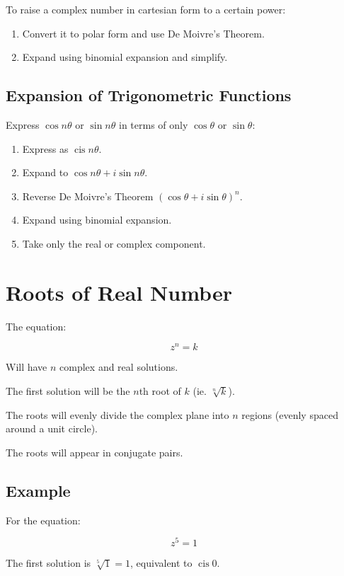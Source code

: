 \documentclass[a4paper,11pt]{article}
\DeclareMathOperator\cis{cis}
\begin{document}
To raise a complex number in cartesian form to a certain power:

\begin{enumerate}
\item Convert it to polar form and use De Moivre's Theorem.
\item Expand using binomial expansion and simplify.
\end{enumerate}


\subsection{Expansion of Trigonometric Functions}

Express $\cos{n \theta}$ or $\sin{n \theta}$ in terms of only $\cos{\theta}$ or
$\sin{\theta}$:

\begin{enumerate}
\item Express as $\cis{n \theta}$.
\item Expand to $\cos{n \theta} + i \sin{n \theta}$.
\item Reverse De Moivre's Theorem $(\cos{\theta} + i \sin{\theta})^n$.
\item Expand using binomial expansion.
\item Take only the real or complex component.
\end{enumerate}




\section{Roots of Real Number}

The equation:

$$
z^n = k
$$

Will have $n$ complex and real solutions.

The first solution will be the $n$th root of $k$ (ie. $\sqrt[n]{k}$).

The roots will evenly divide the complex plane into $n$ regions (evenly spaced
around a unit circle).

The roots will appear in conjugate pairs.


\subsection{Example}

For the equation:

$$
z^5 = 1
$$

The first solution is $\sqrt[5]{1} = 1$, equivalent to $\cis{0}$.
\end{document}
